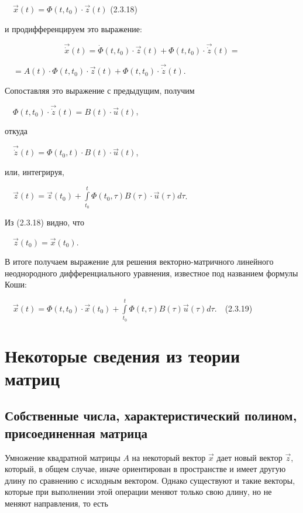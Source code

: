 		\ \  $\vec x(t)=\Phi (t,t_0)\cdot \vec z(t)$  (2.3.18)



		и продифференцируем это выражение:


\begin{equation*}
\vec{\dot x}(t)=\dot \Phi (t,t_0)\cdot \vec z(t)+\Phi (t,t_0)\cdot \vec{\dot z}(t)=
\end{equation*}

		\ \     $=A(t)\cdot \Phi (t,t_0)\cdot \vec z(t)+\Phi (t,t_0)\cdot \vec{\dot z}(t)$.



		Сопоставляя это выражение с предыдущим, получим



		\ \  $\Phi (t,t_0)\cdot \vec{\dot z}(t)=B(t)\cdot \vec u(t)$,



		откуда



		\ \  $\vec{\dot z}(t)=\Phi (t_0,t)\cdot B(t)\cdot \vec u(t)$,



		или, интегрируя,



		\ \  $\vec z(t)=\vec z(t_0)+\overset t{\underset{t_0}{\int }}\Phi (t_0,\tau )B(\tau )\cdot \vec u(\tau )\mathit{d\tau }$.



		Из (2.3.18) видно, что 



		\ \  $\vec z(t_0)=\vec x(t_0)$. 



		В итоге получаем выражение для решения векторно-матричного линейного неоднородного дифферен­циального уравнения,
		известное под названием формулы Коши:



		\ \  $\vec x(t)=\Phi (t,t_0)\cdot \vec x(t_0)+\overset t{\underset{t_0}{\int }}\Phi (t,\tau )B(\tau )\vec u(\tau )\mathit{d\tau }$.\ \ (2.3.19)



\bigskip

\section{Некоторые сведения из теории матриц}
\subsection{Собственные числа, характеристический полином,
	  присоединенная матрица}
\hypertarget{RefHeadingToc455659702}{}
		Умножение квадратной матрицы  $A$ на некоторый вектор  $\vec x$ дает новый вектор  $\vec z$, который, в общем случае,
		иначе ориентирован в про­странстве и имеет другую длину по сравнению с исходным вектором. Однако существуют и такие
		векторы, которые при выполнении этой опе­рации меняют только свою длину, но не меняют направления, то есть



